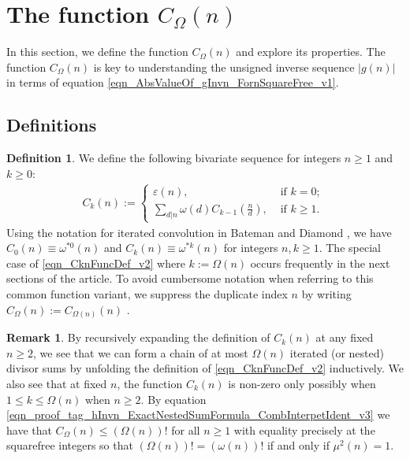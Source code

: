 \documentclass[11pt,reqno,a4letter]{article}
\numberwithin{equation}{section}
\numberwithin{figure}{section}
\numberwithin{table}{section}
\newcommand{\seqnum}[1]{\href{http://oeis.org/#1}{\color{ProcessBlue}{\underline{#1}}}}
\theoremstyle{plain}
\numberwithin{theorem}{section}
\theoremstyle{definition}
\newtheorem{remark}[theorem]{Remark}
\newtheorem{definition}[theorem]{Definition}
\theoremstyle{remark}
\begin{document}
\section{The function $C_{\Omega}(n)$} 
\label{Section_NewFormulasForgInvn_v1} 

In this section, we define the function 
$C_{\Omega}(n)$ and explore its properties. 
The function $C_{\Omega}(n)$ is key to understanding the 
unsigned inverse sequence $|g(n)|$ in terms of equation 
\eqref{eqn_AbsValueOf_gInvn_FornSquareFree_v1}. 

\subsection{Definitions}

\begin{definition}
We define the following bivariate sequence for integers $n \geq 1$ and $k \geq 0$: 
\begin{align} 
\label{eqn_CknFuncDef_v2} 
C_k(n) := \begin{cases} 
     \varepsilon(n), & \text{ if $k = 0$; } \\ 
     \sum\limits_{d|n} \omega(d) C_{k-1}\left(\frac{n}{d}\right), & \text{ if $k \geq 1$. } 
     \end{cases} 
\end{align} 
Using the notation for iterated convolution in 
Bateman and Diamond \cite[Def.~2.3; \S 2]{ANT-BATEMAN-DIAMOND}, we have 
$C_0(n) \equiv \omega^{\ast 0}(n)$ and $C_k(n) \equiv \omega^{\ast k}(n)$ for 
integers $n, k \geq 1$. 
The special case of \eqref{eqn_CknFuncDef_v2} where 
$k := \Omega(n)$ occurs frequently in the next sections of the 
article. To avoid cumbersome notation when referring to this common function variant, we suppress the 
duplicate index $n$ by writing $C_{\Omega}(n) := C_{\Omega(n)}(n)$ \cite[\seqnum{A008480}]{OEIS}. 
\end{definition}

\begin{remark}
By recursively expanding the definition of $C_k(n)$ 
at any fixed $n \geq 2$, we see that 
we can form a chain of at most $\Omega(n)$ iterated (or nested) divisor sums by 
unfolding the definition of \eqref{eqn_CknFuncDef_v2} inductively. 
We also see that at fixed $n$, the function 
$C_k(n)$ is non-zero only possibly when 
$1 \leq k \leq \Omega(n)$ when $n \geq 2$. 
By equation \eqref{eqn_proof_tag_hInvn_ExactNestedSumFormula_CombInterpetIdent_v3} we have 
that $C_{\Omega}(n) \leq (\Omega(n))!$ for all $n \geq 1$ with 
equality precisely at the squarefree integers so that 
$(\Omega(n))! = (\omega(n))!$ if and only if $\mu^2(n) = 1$. 
\end{remark}
\end{document}
